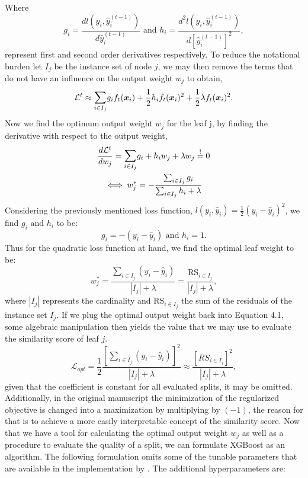 \documentclass[a4paper,12pt, headsepline]{scrartcl}
\numberwithin{equation}{section}
\begin{document}
Where 
\[
g_i = \frac{d l(y_i, \hat y_i^{(t-1)})}{d \hat y_i^{(t-1)}} \text{ and } h_i = \frac{d^2 l(y_i, \hat y_i^{(t-1)})}{d \left[\hat y_i^{(t-1)}\right]^2},
\]
represent first and second order derivatives respectively. To reduce the notational burden let $I_j$ be the instance set of node $j$, we may then remove the terms that do not have an influence on the output weight $w_j$ to obtain, 
\begin{gather}
\mathcal{L}^t \approx \mathlarger{\sum}\limits_{i \in I_j} g_i f_t(\bm x_i) + \frac{1}{2}h_i f_t( \bm x_i)^2 + \frac{1}{2}\lambda f_t(\bm x_i)^2.
\end{gather}
Now we find the optimum output weight $w_j$ for the leaf j, by finding the derivative with respect to the output weight,
\begin{gather*}
\frac{d \mathcal{L}^t}{d w_j} =  \mathlarger{\sum}\limits_{i \in I_j} g_i + h_i w_j + \lambda w_j \overset{!}{=} 0 \\ \iff w^*_j = - \frac{\sum_{i \in I_j} g_i}{\sum_{i \in I_j} h_i + \lambda}
\end{gather*}
Considering the previously mentioned loss function, $l(y_i, \hat y_i) = \frac{1}{2} (y_i - \hat  y_i)^2$, we find $g_i \text{ and } h_i$ to be:
\[
g_i = -(y_i - \hat y_i)\text{ and } h_i = 1.
\]
Thus for the quadratic loss function at hand, we find the optimal leaf weight to be:
\[
w^*_j =  \frac{\sum_{i \in I_j} (y_i - \hat  y_i)}{|I_j| + \lambda} = \frac{\text{RS}_{i \in I_j}}{|I_j| + \lambda},
\]
where $|I_j|$ represents the cardinality and $\text{RS}_{i \in I_j}$ the sum of the residuals of the instance set $I_j$. If we plug the optimal output weight back into Equation 4.1, some algebraic manipulation then yields the value that we may use to evaluate the similarity score of leaf $j$.
\[
\mathcal{L}_{opt} = \frac{1}{2}\frac{[\sum_{i \in I_j} (y_i - \hat  y_i)]^2}{|I_j| + \lambda} \approx \frac{[RS_{i \in I_j}]^2}{|I_j| + \lambda},
\]
given that the coefficient is constant for all evaluated splits, it may be omitted. Additionally, in the original manuscript the minimization of the regularized objective is changed into a maximization by multiplying by $(-1)$, the reason for that is to achieve a more easily interpretable concept of the similarity score. Now that we have a tool for calculating the optimal output weight $w_j$ as well as a procedure to evaluate the quality of a split, we can formulate XGBoost as an algorithm. The following formulation omits some of the tunable parameters that are available in the implementation by \citet{xgboost}. The additional hyperparameters are:
\end{document}
